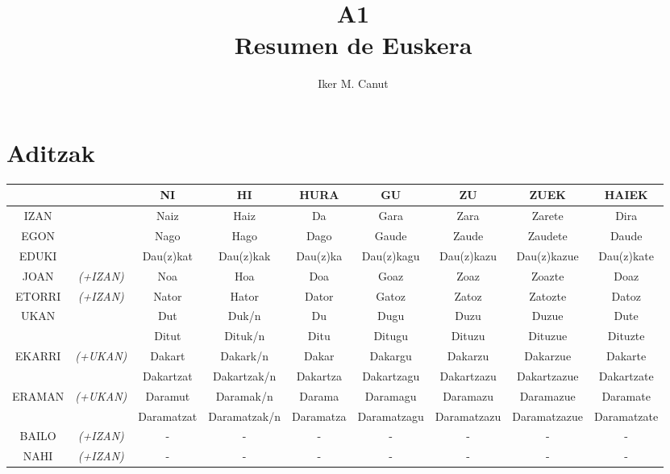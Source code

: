 \documentclass[12pt, a4paper, landscape]{article}
\begin{document}
\author{Iker M. Canut}
\title{A1\\
\large{Resumen de Euskera\\}
}
\maketitle
\newpage

\tableofcontents
\newpage

\section{Aditzak}
\begin{table}[h]
\begin{center}
\begin{tabular}{|cc|c|c|c|c|c|c|c|}
\hline
&& NI & HI & HURA & GU & ZU & ZUEK & HAIEK \\
\hline
IZAN && Naiz & Haiz & Da & Gara & Zara & Zarete & Dira \\
\hline
EGON && Nago & Hago & Dago & Gaude & Zaude & Zaudete & Daude \\
\hline
EDUKI && Dau(z)kat & Dau(z)kak & Dau(z)ka & Dau(z)kagu & Dau(z)kazu & Dau(z)kazue & Dau(z)kate \\
\hline
JOAN & \small{\textit{(+IZAN)}} & Noa & Hoa & Doa & Goaz & Zoaz & Zoazte & Doaz \\
\hline
ETORRI & \small{\textit{(+IZAN)}} & Nator & Hator & Dator & Gatoz & Zatoz & Zatozte & Datoz \\
\hline
\multirow{2}{*}{UKAN} && Dut & Duk/n & Du & Dugu & Duzu & Duzue & Dute \\ && Ditut & Dituk/n & Ditu & Ditugu & Dituzu & Dituzue & Dituzte \\
\hline
\multirow{2}{*}{EKARRI} &\multirow{2}{*}{ \small{\textit{(+UKAN)}} }& Dakart & Dakark/n & Dakar & Dakargu & Dakarzu & Dakarzue & Dakarte \\ && Dakartzat & Dakartzak/n & Dakartza & Dakartzagu & Dakartzazu & Dakartzazue & Dakartzate \\
\hline
\multirow{2}{*}{ERAMAN} &\multirow{2}{*}{ \small{\textit{(+UKAN)}} }& Daramut & Daramak/n & Darama & Daramagu & Daramazu & Daramazue & Daramate \\ && Daramatzat & Daramatzak/n & Daramatza & Daramatzagu & Daramatzazu & Daramatzazue & Daramatzate \\
\hline
BAILO & \small{\textit{(+IZAN)}} & - & - & - & - & - & - & - \\
\hline
NAHI & \small{\textit{(+IZAN)}} & - & - & - & - & - & - & - \\
\hline
\end{tabular}
\end{center}
\end{table}
\newpage
\end{document}

